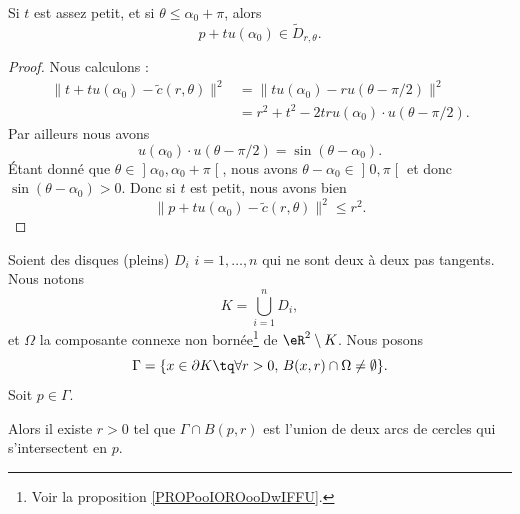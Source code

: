 \begin{proposition}	\label{PROPooNGGUooFgZaqT}
	Si \( t\) est assez petit, et si \( \theta\leq \alpha_0+\pi\), alors
	\begin{equation}
		p+tu(\alpha_0)\in \tilde D_{r,\theta}.
	\end{equation}
\end{proposition}

\begin{proof}
	Nous calculons :
	\begin{subequations}
		\begin{align}
			\| t+tu(\alpha_0)-\tilde c(r,\theta) \|^2 & =\| tu(\alpha_0)-ru(\theta-\pi/2) \|^2        \\
			                                          & =r^2+t^2-2tru(\alpha_0)\cdot u(\theta-\pi/2).
		\end{align}
	\end{subequations}
	Par ailleurs nous avons
	\begin{equation}
		u(\alpha_0)\cdot u(\theta-\pi/2)=\sin(\theta-\alpha_0).
	\end{equation}
	Étant donné que \( \theta\in\mathopen] \alpha_0,\alpha_0+\pi\mathclose[\), nous avons \( \theta-\alpha_0\in \mathopen] 0,\pi\mathclose[\) et donc \( \sin(\theta-\alpha_0)>0\). Donc si \( t\) est petit, nous avons bien
	\begin{equation}
		\| p+tu(\alpha_0)-\tilde c(r,\theta) \|^2\leq r^2.
	\end{equation}
\end{proof}


\begin{proposition}	\label{PROPooITHUooXrBYMG}
	Soient des disques (pleins) \( D_i\) \( i=1,\ldots,n\) qui ne sont deux à deux pas tangents. Nous notons
	\begin{equation}
		K=\bigcup_{i=1}^nD_i,
	\end{equation}
	et \( \Omega\) la composante connexe non bornée\footnote{Voir la proposition \ref{PROPooIOROooDwIFFU}.} de \( \eR^2\setminus K\). Nous posons
	\begin{equation}
		\Gamma=\{ x\in\partial K\tq \forall r>0,\,B(x,r)\cap\Omega\neq\emptyset \}.
	\end{equation}
	Soit \( p\in \Gamma\).

	Alors il existe \( r>0\) tel que \( \Gamma\cap B(p,r)\) est l'union de deux arcs de cercles qui s'intersectent en \( p\).
\end{proposition}


